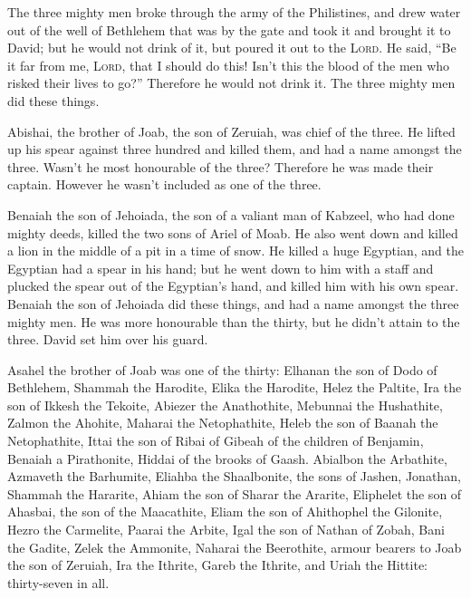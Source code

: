  The three mighty men broke through the army of the
Philistines, and drew water out of the well of Bethlehem that was by the
gate and took it and brought it to David; but he would not drink of it,
but poured it out to the \textsc{Lord}.  He said, ``Be it
far from me, \textsc{Lord}, that I should do this! Isn't this the blood
of the men who risked their lives to go?'' Therefore he would not drink
it. The three mighty men did these things.

 Abishai, the brother of Joab, the son of Zeruiah, was
chief of the three. He lifted up his spear against three hundred and
killed them, and had a name amongst the three.  Wasn't he
most honourable of the three? Therefore he was made their captain.
However he wasn't included as one of the three.

 Benaiah the son of Jehoiada, the son of a valiant man of
Kabzeel, who had done mighty deeds, killed the two sons of Ariel of
Moab. He also went down and killed a lion in the middle of a pit in a
time of snow.  He killed a huge Egyptian, and the
Egyptian had a spear in his hand; but he went down to him with a staff
and plucked the spear out of the Egyptian's hand, and killed him with
his own spear.  Benaiah the son of Jehoiada did these
things, and had a name amongst the three mighty men.  He
was more honourable than the thirty, but he didn't attain to the three.
David set him over his guard.

 Asahel the brother of Joab was one of the thirty:
Elhanan the son of Dodo of Bethlehem,  Shammah the
Harodite, Elika the Harodite,  Helez the Paltite, Ira the
son of Ikkesh the Tekoite,  Abiezer the Anathothite,
Mebunnai the Hushathite,  Zalmon the Ahohite, Maharai the
Netophathite,  Heleb the son of Baanah the Netophathite,
Ittai the son of Ribai of Gibeah of the children of Benjamin,
 Benaiah a Pirathonite, Hiddai of the brooks of Gaash.
 Abialbon the Arbathite, Azmaveth the Barhumite,
 Eliahba the Shaalbonite, the sons of Jashen, Jonathan,
 Shammah the Hararite, Ahiam the son of Sharar the
Ararite,  Eliphelet the son of Ahasbai, the son of the
Maacathite, Eliam the son of Ahithophel the Gilonite, 
Hezro the Carmelite, Paarai the Arbite,  Igal the son of
Nathan of Zobah, Bani the Gadite,  Zelek the Ammonite,
Naharai the Beerothite, armour bearers to Joab the son of Zeruiah,
 Ira the Ithrite, Gareb the Ithrite,  and
Uriah the Hittite: thirty-seven in all.

